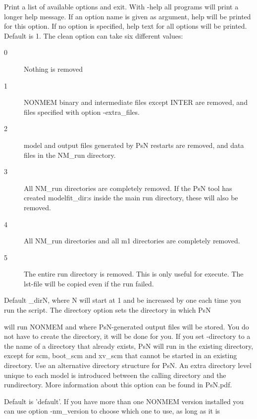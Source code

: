 \begin{optionlist}
Print a list of available options and exit. 
\nextopt
{}
With -help all programs will print a longer help message. If an option name is given as argument, help will be printed for this option. If no option is specified, help text for all options will be printed. 
\nextopt
{}
Default is 1. The clean option can take six different values:  
\begin{description}
	\item[0] Nothing is removed 
	\item[1] NONMEM binary and intermediate files except INTER are removed, and files specified with option -extra\_files. 
	\item[2] model and output files generated by PsN restarts are removed, and data files in the NM\_run directory. 
	\item[3] All NM\_run directories are completely removed. If the PsN tool has created modelfit\_dir:s inside the main run directory, these  will also be removed. 
	\item[4] All NM\_run directories and all m1 directories are completely removed.
    \item[5] The entire run directory is removed. This is only useful for execute. The lst-file will be copied even if the run failed.
\end{description}
\nextopt
{}

Default \guidetoolname\_dirN,
where N will start at 1 and be increased by one each time you run the script. The directory option sets the directory in which PsN 

will run NONMEM and where PsN-generated output files will be stored. You do not have to create the directory,  it will be done for you. If you set -directory to a the name of a directory that already exists, PsN will run in the existing directory, except for scm, boot\_scm and xv\_scm that cannot be started in an existing directory.
\nextopt
{}
	Use an alternative directory structure for PsN. An extra directory
    level unique to each model is introduced between the calling
    directory and the rundirectory. More information about this option can
    be found in PsN.pdf.
\nextopt
   
Default is 'default'. 
If you have more than one NONMEM version installed you can use option -nm\_version to choose which one to use, as long as it is 


\end{optionlist}
